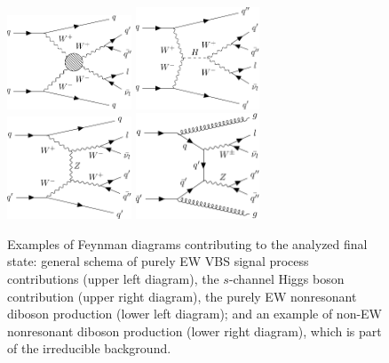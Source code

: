 \begin{figure}[htb]
  \centering
  \includegraphics[width=0.33\textwidth]{Images/VBS_Studies/Figure_001-a.pdf}
  \hspace{2cm}
  \includegraphics[width=0.33\textwidth]{Images/VBS_Studies/Figure_001-b.pdf}
  \vspace{1cm}
  \includegraphics[width=0.33\textwidth]{Images/VBS_Studies/Figure_001-c.pdf}
  \hspace{2cm}
  \includegraphics[width=0.33\textwidth]{Images/VBS_Studies/Figure_001-d.pdf}

\caption{Examples of Feynman diagrams contributing to the analyzed final state:
general schema of purely EW VBS signal process contributions (upper
left diagram), the $s$-channel Higgs boson contribution (upper right
diagram), the purely EW nonresonant diboson production (lower left
diagram); and an example of non-EW nonresonant diboson production
(lower right diagram), which is part of the irreducible background. } \label{fig:diagram}
\end{figure}


